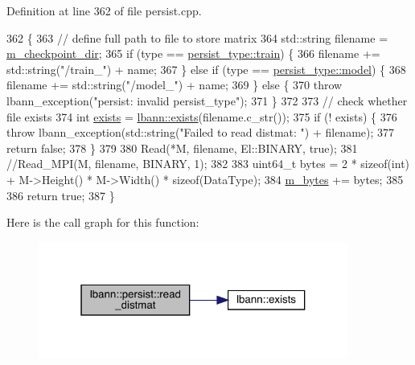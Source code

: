 Definition at line 362 of file persist.\+cpp.


\begin{DoxyCode}
362                                                                                \{
363   \textcolor{comment}{// define full path to file to store matrix}
364   std::string filename = \hyperlink{classlbann_1_1persist_a17c2b08ec1815aba6d3eae6502397bb1}{m\_checkpoint\_dir};
365   \textcolor{keywordflow}{if} (type == \hyperlink{namespacelbann_adee41f31f15f3906cbdcce4a1417eb56a61b3a8faa9c1091806675c230a9abe64}{persist\_type::train}) \{
366     filename += std::string(\textcolor{stringliteral}{"/train\_"}) + name;
367   \} \textcolor{keywordflow}{else} \textcolor{keywordflow}{if} (type == \hyperlink{namespacelbann_adee41f31f15f3906cbdcce4a1417eb56a20f35e630daf44dbfa4c3f68f5399d8c}{persist\_type::model}) \{
368     filename += std::string(\textcolor{stringliteral}{"/model\_"}) + name;
369   \} \textcolor{keywordflow}{else} \{
370     \textcolor{keywordflow}{throw} lbann\_exception(\textcolor{stringliteral}{"persist: invalid persist\_type"});
371   \}
372 
373   \textcolor{comment}{// check whether file exists}
374   \textcolor{keywordtype}{int} \hyperlink{namespacelbann_aefae2a9fc9d742ece0fa8ca7ed9ee137}{exists} = \hyperlink{namespacelbann_aefae2a9fc9d742ece0fa8ca7ed9ee137}{lbann::exists}(filename.c\_str());
375   \textcolor{keywordflow}{if} (! exists) \{
376     \textcolor{keywordflow}{throw} lbann\_exception(std::string(\textcolor{stringliteral}{"Failed to read distmat: "}) + filename);
377     \textcolor{keywordflow}{return} \textcolor{keyword}{false};
378   \}
379 
380   Read(*M, filename, El::BINARY, \textcolor{keyword}{true});
381   \textcolor{comment}{//Read\_MPI(M, filename, BINARY, 1);}
382 
383   uint64\_t bytes = 2 * \textcolor{keyword}{sizeof}(int) + M->Height() * M->Width() * \textcolor{keyword}{sizeof}(DataType);
384   \hyperlink{classlbann_1_1persist_a0bd4fd42d9858a5210c8034dfbb666d4}{m\_bytes} += bytes;
385 
386   \textcolor{keywordflow}{return} \textcolor{keyword}{true};
387 \}
\end{DoxyCode}
Here is the call graph for this function\+:\nopagebreak
\begin{figure}[H]
\begin{center}
\leavevmode
\includegraphics[width=289pt]{classlbann_1_1persist_aa98be93f33b510e5b506b61de6bd79bd_cgraph}
\end{center}
\end{figure}
